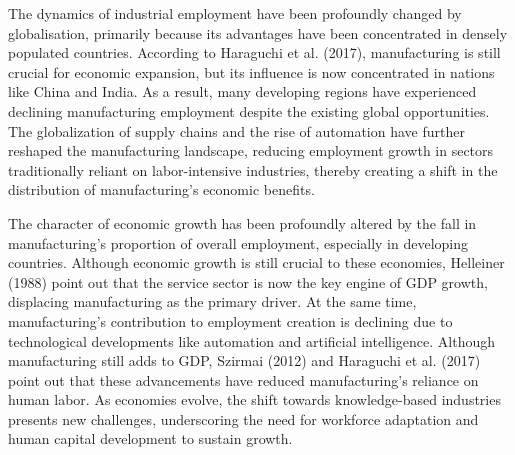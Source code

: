\documentclass[12pt]{article}
\begin{document}
The dynamics of industrial employment have been profoundly changed by globalisation, primarily because its advantages have been concentrated in densely populated countries. According to Haraguchi et al. (2017), manufacturing is still crucial for economic expansion, but its influence is now concentrated in nations like China and India. As a result, many developing regions have experienced declining manufacturing employment despite the existing global opportunities. The globalization of supply chains and the rise of automation have further reshaped the manufacturing landscape, reducing employment growth in sectors traditionally reliant on labor-intensive industries, thereby creating a shift in the distribution of manufacturing's economic benefits.

The character of economic growth has been profoundly altered by the fall in manufacturing's proportion of overall employment, especially in developing countries. Although economic growth is still crucial to these economies, Helleiner (1988) point out that the service sector is now the key engine of GDP growth, displacing manufacturing as the primary driver. At the same time, manufacturing's contribution to employment creation is declining due to technological developments like automation and artificial intelligence. Although manufacturing still adds to GDP, Szirmai (2012) and Haraguchi et al. (2017) point out that these advancements have reduced manufacturing's reliance on human labor. As economies evolve, the shift towards knowledge-based industries presents new challenges, underscoring the need for workforce adaptation and human capital development to sustain growth.
\end{document}
